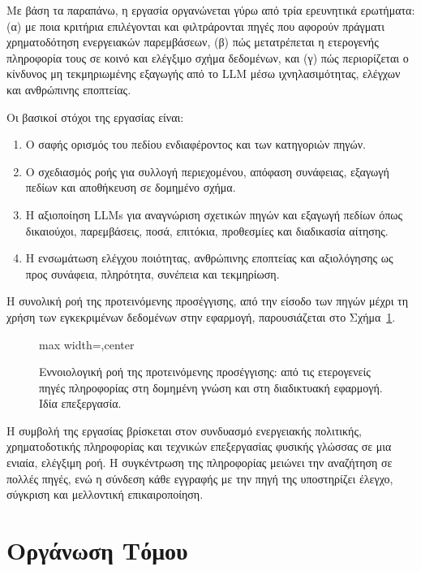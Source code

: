 Με βάση τα παραπάνω, η εργασία οργανώνεται γύρω από τρία ερευνητικά ερωτήματα:
(α) με ποια κριτήρια επιλέγονται και φιλτράρονται πηγές που αφορούν πράγματι
χρηματοδότηση ενεργειακών παρεμβάσεων, (β) πώς μετατρέπεται η ετερογενής
πληροφορία τους σε κοινό και ελέγξιμο σχήμα δεδομένων, και (γ) πώς
περιορίζεται ο κίνδυνος μη τεκμηριωμένης εξαγωγής από το LLM μέσω
ιχνηλασιμότητας, ελέγχων και ανθρώπινης εποπτείας.

Οι βασικοί στόχοι της εργασίας είναι:

\begin{enumerate}
    \item Ο σαφής ορισμός του πεδίου ενδιαφέροντος και των κατηγοριών πηγών.
    \item Ο σχεδιασμός ροής για συλλογή περιεχομένου, απόφαση συνάφειας,
    εξαγωγή πεδίων και αποθήκευση σε δομημένο σχήμα.
    \item Η αξιοποίηση LLMs για αναγνώριση σχετικών πηγών και εξαγωγή πεδίων
    όπως δικαιούχοι, παρεμβάσεις, ποσά, επιτόκια, προθεσμίες και διαδικασία
    αίτησης.
    \item Η ενσωμάτωση ελέγχου ποιότητας, ανθρώπινης εποπτείας και αξιολόγησης
    ως προς συνάφεια, πληρότητα, συνέπεια και τεκμηρίωση.
\end{enumerate}

Η συνολική ροή της προτεινόμενης προσέγγισης, από την είσοδο των πηγών μέχρι
τη χρήση των εγκεκριμένων δεδομένων στην εφαρμογή, παρουσιάζεται στο
Σχήμα~\ref{fig:pipeline-concept}.

\begin{figure}[!htbp]
    \centering
    \begin{adjustbox}{max width=\textwidth,center}
        
    \end{adjustbox}
    \caption[Εννοιολογική ροή της προτεινόμενης προσέγγισης]{Εννοιολογική ροή της προτεινόμενης προσέγγισης: από τις ετερογενείς πηγές πληροφορίας στη δομημένη γνώση και στη διαδικτυακή εφαρμογή. Ιδία επεξεργασία.}
    \label{fig:pipeline-concept}
\end{figure}

Η συμβολή της εργασίας βρίσκεται στον συνδυασμό ενεργειακής πολιτικής,
χρηματοδοτικής πληροφορίας και τεχνικών επεξεργασίας φυσικής γλώσσας σε μια
ενιαία, ελέγξιμη ροή. Η συγκέντρωση της πληροφορίας μειώνει την αναζήτηση σε
πολλές πηγές, ενώ η σύνδεση κάθε εγγραφής με την πηγή της υποστηρίζει έλεγχο,
σύγκριση και μελλοντική επικαιροποίηση.

\section{Οργάνωση Τόμου}

